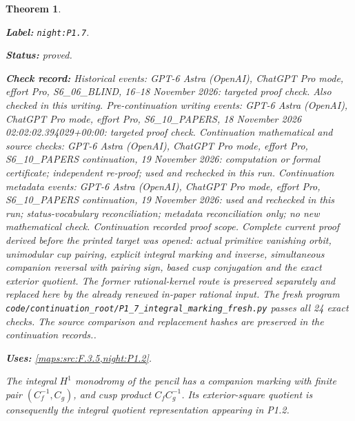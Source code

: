\documentclass[11pt,a4paper]{article}
\newtheorem{theorem}{Theorem}[section]
\theoremstyle{definition}
\newcommand{\StatementRecord}[4]{\par\smallskip\begingroup\upshape\raggedright\noindent\textbf{Label:} \nolinkurl{#1}.\par\noindent\textbf{Status:} #2.\par\noindent\textbf{Check record:} #3.\par\noindent\textbf{Uses:} #4.\par\endgroup\smallskip}
\begin{document}
\begin{theorem}\label{night:P1.7}
\StatementRecord{night:P1.7}{proved}{Historical events: GPT-6 Astra (OpenAI), ChatGPT Pro mode, effort Pro, S6\_06\_BLIND, 16--18 November 2026: targeted proof check. Also checked in this writing. Pre-continuation writing events: GPT-6 Astra (OpenAI), ChatGPT Pro mode, effort Pro, S6\_10\_PAPERS, 18 November 2026 02:02:02.394029+00:00: targeted proof check. Continuation mathematical and source checks: GPT-6 Astra (OpenAI), ChatGPT Pro mode, effort Pro, S6\_10\_PAPERS continuation, 19 November 2026: computation or formal certificate; independent re-proof; used and rechecked in this run. Continuation metadata events: GPT-6 Astra (OpenAI), ChatGPT Pro mode, effort Pro, S6\_10\_PAPERS continuation, 19 November 2026: used and rechecked in this run; status-vocabulary reconciliation; metadata reconciliation only; no new mathematical check. \emph{Continuation recorded proof scope.} Complete current proof derived before the printed target was opened: actual primitive vanishing orbit, unimodular cup pairing, explicit integral marking and inverse, simultaneous companion reversal with pairing sign, based cusp conjugation and the exact exterior quotient. The former rational-kernel route is preserved separately and replaced here by the already renewed in-paper rational input. The fresh program \texttt{code/continuation\_root/P1\_7\_integral\_marking\_fresh.py} passes all 24 exact checks. The source comparison and replacement hashes are preserved in the continuation records.}{\cref{maps:src:F.3.5,night:P1.2}}
The integral $H^1$ monodromy of the pencil has a companion marking with
finite pair $(C_f^{-1},C_g)$, and cusp product $C_fC_g^{-1}$.
Its exterior-square quotient is consequently the integral quotient
representation appearing in P1.2.
\end{theorem}
\end{document}

